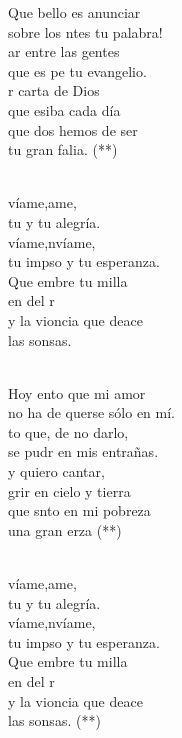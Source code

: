 \documentclass[12pt]{article}
\begin{document}
\begin{multicols*}{2}
\begin{cancion}%
	Que bello es anunciar \\
	sobre los ntes tu palabra!\\
	ar entre las gentes \\
	que es pe tu evangelio.\\
	r carta de Dios\\
	que esiba cada día\\
	que dos hemos de ser \\
	tu gran falia. (**)\\\jump\\
	\begin{chorus}%
	víame,ame, \\
	tu y tu alegría.\\
	víame,nvíame,\\
	tu impso y tu esperanza.\\
	Que embre tu milla\\
	en  del r\\
	y la vioncia que deace \\
	las sonsas.\\
	\end{chorus}%
	\jump\\
	Hoy ento que mi amor \\
	no ha de querse sólo en mí.\\
	to que, de no darlo,\\
	se pudr en mis entrañas.\\
	y quiero cantar,\\
	grir en cielo y tierra\\
	que snto en mi pobreza \\
	una gran erza (**)\\\jump\\
	\begin{chorus}%
	víame,ame, \\
	tu y tu alegría.\\
	víame,nvíame,\\
	tu impso y tu esperanza.\\
	Que embre tu milla\\
	en  del r\\
	y la vioncia que deace \\
	las sonsas. (**)\\
	\end{chorus}%
	\jump\\
\end{cancion}%


\end{multicols*}
\end{document}
